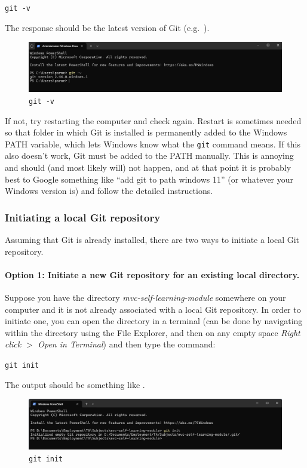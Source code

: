 \documentclass[a4paper,10pt]{article}
\begin{document}
\texttt{git -v}

The response should be the latest version of Git (e.g.\ ). 

\begin{figure}[htbp]
    \centering
    \includegraphics[width=\textwidth]{git-v.png}
    \caption{\texttt{git -v}}
    \label{fig:git-v}   
\end{figure}

If not, try restarting the computer and check again. Restart is sometimes needed so that folder in which Git is installed is permanently added to the Windows PATH variable, which lets Windows know what the \texttt{git} command means. If this also doesn't work, Git must be added to the PATH manually. This is annoying and should (and most likely will) not happen, and at that point it is probably best to Google something like ``add git to path windows 11'' (or whatever your Windows version is) and follow the detailed instructions.

\subsubsection{Initiating a local Git repository}
\label{sec:git_init}

Assuming that Git is already installed, there are two ways to initiate a local Git repository.

\paragraph{Option 1: Initiate a new Git repository for an existing local directory.} Suppose you have the directory \emph{mvc-self-learning-module} somewhere on your computer and it is not already associated with a local Git repository. In order to initiate one, you can open the directory in a terminal (can be done by navigating within the directory using the File Explorer, and then on any empty space \emph{Right click} $>$ \emph{Open in Terminal}) and then type the command: 

\texttt{git init}

The output should be something like .

\begin{figure}[htbp]
    \centering
    \includegraphics[width=\textwidth]{git_init.png}
    \caption{\texttt{git init}}
    \label{fig:git_init}   
\end{figure}
\end{document}
